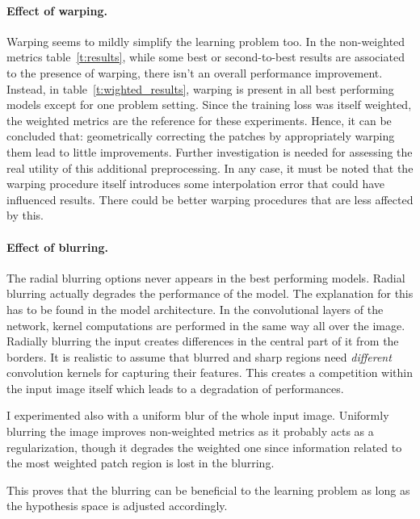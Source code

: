 \paragraph{Effect of warping.}
Warping seems to mildly simplify the learning problem too.
In the non-weighted metrics table~\ref{t:results}, while some best or second-to-best results are associated to the presence of warping, there isn't an overall performance improvement.
Instead, in table~\ref{t:wighted_results}, warping is present in all best performing models except for one problem setting.
Since the training loss was itself weighted, the weighted metrics are the reference for these experiments.
Hence, it can be concluded that: geometrically correcting the patches by appropriately warping them lead to little improvements.
Further investigation is needed for assessing the real utility of this additional preprocessing.
In any case, it must be noted that the warping procedure itself introduces some interpolation error that could have influenced results.
There could be better warping procedures that are less affected by this.

\paragraph{Effect of blurring.}
The radial blurring options never appears in the best performing models.
Radial blurring actually degrades the performance of the model.
The explanation for this has to be found in the model architecture.
In the convolutional layers of the network, kernel computations are performed in the same way all over the image.
Radially blurring the input creates differences in the central part of it from the borders.
It is realistic to assume that blurred and sharp regions need \textit{different} convolution kernels for capturing their features.
This creates a competition within the input image itself which leads to a degradation of performances.

I experimented also with a uniform blur of the whole input image.
Uniformly blurring the image improves non-weighted metrics as it probably acts as a regularization, though it degrades the weighted one since information related to the most weighted patch region is lost in the blurring.

This proves that the blurring can be beneficial to the learning problem as long as the hypothesis space is adjusted accordingly.

